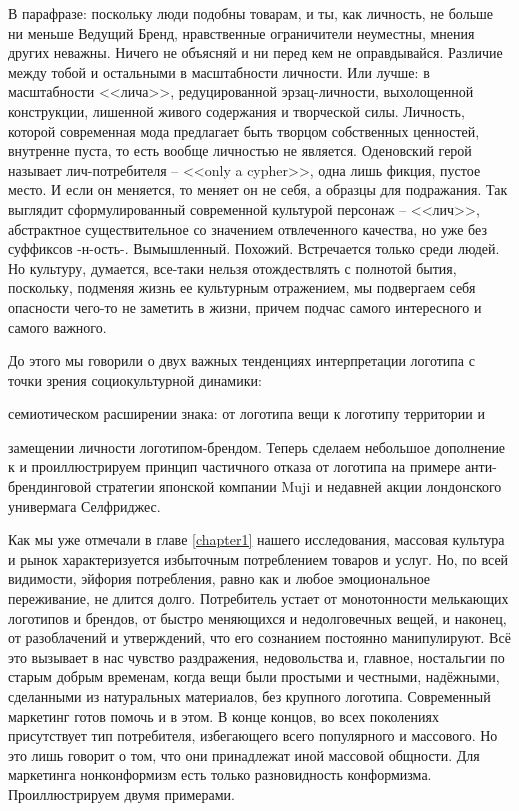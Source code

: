 В парафразе: поскольку люди подобны товарам, и ты, как личность, не больше ни меньше Ведущий Бренд,
нравственные ограничители неуместны, мнения других неважны. Ничего не объясняй и ни перед кем не
оправдывайся. Различие между тобой и остальными в масштабности личности. Или лучше: в масштабности
<<лича>>, редуцированной эрзац-личности, выхолощенной конструкции, лишенной живого содержания и
творческой силы. Личность, которой современная мода предлагает быть творцом собственных ценностей,
внутренне пуста, то есть вообще личностью не является. Оденовский герой называет лич-потребителя --
<<only a cypher>>, одна лишь фикция, пустое место. И если он меняется, то меняет он не себя, а образцы
для подражания. Так выглядит сформулированный современной культурой персонаж -- <<лич>>, абстрактное
существительное со значением отвлеченного качества, но уже без суффиксов -н-ость-. Вымышленный.
Похожий. Встречается только среди людей. Но культуру, думается, все-таки
нельзя отождествлять с полнотой бытия, поскольку, подменяя жизнь ее культурным отражением, мы
подвергаем себя опасности чего-то не заметить в жизни, причем подчас самого интересного и самого
важного.

До этого мы говорили о двух важных тенденциях интерпретации логотипа с точки зрения социокультурной
динамики:
\begin{enumerate*}[label=\arabic*)]
\item семиотическом расширении знака: от логотипа вещи к логотипу территории и
\item замещении личности логотипом-брендом. Теперь сделаем небольшое дополнение к и проиллюстрируем
  принцип частичного отказа от логотипа на примере анти-брендинговой стратегии японской компании
  Muji и недавней акции лондонского универмага Селфриджес.
\end{enumerate*}

Как мы уже отмечали в главе \ref{chapter1} нашего исследования, массовая культура и рынок характеризуется
избыточным потреблением товаров и услуг. Но, по всей видимости, эйфория потребления, равно как и
любое эмоциональное переживание, не длится долго. Потребитель устает от монотонности мелькающих
логотипов и брендов, от быстро меняющихся и недолговечных вещей, и наконец, от разоблачений и
утверждений, что его сознанием постоянно манипулируют. Всё это вызывает в нас чувство раздражения,
недовольства и, главное, ностальгии по старым добрым временам, когда вещи были простыми и честными,
надёжными, сделанными из натуральных материалов, без крупного логотипа. Современный маркетинг готов
помочь и в этом. В конце концов, во всех поколениях присутствует тип потребителя, избегающего всего
популярного и массового. Но это лишь говорит о том, что они принадлежат иной массовой
общности. \autocite{lindstrom2011brandwashed}  Для маркетинга
нонконформизм есть только разновидность конформизма. Проиллюстрируем двумя примерами.

